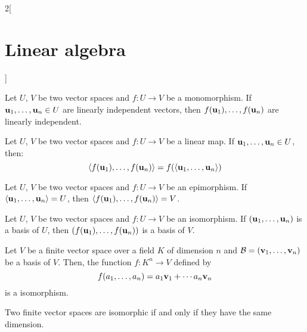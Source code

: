 \documentclass[../../../main.tex]{subfiles}
\begin{document}
\begin{multicols}{2}[\section{Linear algebra}]
\begin{definition}
  \end{definition}
  \begin{prop}
    Let $U$, $V$ be two vector spaces and $f:U\rightarrow V$ be a monomorphism. If $\boldsymbol{\mathrm{u}}_1,\ldots,\boldsymbol{\mathrm{u}}_n\in U$ are linearly independent vectors, then $f(\boldsymbol{\mathrm{u}}_1),\ldots,f(\boldsymbol{\mathrm{u}}_n)$  are linearly independent.
  \end{prop}
  \begin{lemma}
    Let $U$, $V$ be two vector spaces and $f:U\rightarrow V$ be a linear map. If $\boldsymbol{\mathrm{u}}_1,\ldots,\boldsymbol{\mathrm{u}}_n\in U$, then: $$\langle f(\boldsymbol{\mathrm{u}}_1),\ldots,f(\boldsymbol{\mathrm{u}}_n)\rangle=f(\langle\boldsymbol{\mathrm{u}}_1,\ldots,\boldsymbol{\mathrm{u}}_n\rangle)$$
  \end{lemma}
  \begin{corollary}
    Let $U$, $V$ be two vector spaces and $f:U\rightarrow V$ be an epimorphism. If $\langle\boldsymbol{\mathrm{u}}_1,\ldots,\boldsymbol{\mathrm{u}}_n\rangle= U$, then $\langle f(\boldsymbol{\mathrm{u}}_1),\ldots,f(\boldsymbol{\mathrm{u}}_n)\rangle=V$.
  \end{corollary}
  \begin{corollary}
    Let $U$, $V$ be two vector spaces and $f:U\rightarrow V$ be an isomorphism. If $(\boldsymbol{\mathrm{u}}_1,\ldots,\boldsymbol{\mathrm{u}}_n)$ is a basis of $U$, then $(f(\boldsymbol{\mathrm{u}}_1),\ldots,f(\boldsymbol{\mathrm{u}}_n))$ is a basis of $V$.
  \end{corollary}
  \begin{theorem}
    Let $V$ be a finite vector space over a field $K$ of dimension $n$ and $\mathcal{B}=(\boldsymbol{\mathrm{v}}_1,\ldots,\boldsymbol{\mathrm{v}}_n)$ be a basis of $V$. Then, the function $f:K^n\rightarrow V$ defined by $$f(a_1,\ldots,a_n)=a_1\boldsymbol{\mathrm{v}}_1+\cdots a_n\boldsymbol{\mathrm{v}}_n$$ is a isomorphism.
  \end{theorem}
  \begin{corollary}
    Two finite vector spaces are isomorphic if and only if they have the same dimension.
  \end{corollary}

\end{multicols}
\end{document}
